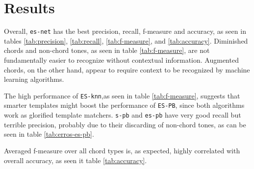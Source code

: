 \documentclass{article}
\begin{document}
\section{Results}
\label{sec:discussion}


Overall, \texttt{es-net} has the best precision, recall, f-measure and
accuracy, as seen in tables \ref{tab:precision}, \ref{tab:recall},
\ref{tab:f-measure}, and \ref{tab:accuracy}. Diminished chords and
non-chord tones, as seen in table \ref{tab:f-measure}, are not
fundamentally easier to recognize without contextual
information. Augmented chords, on the other hand, appear to require
context to be recognized by machine learning algorithms.

The high performance of \texttt{ES-knn},as seen in table
\ref{tab:f-measure}, suggests that smarter templates might boost the
performance of \texttt{ES-PB}, since both algorithms work as glorified
template matchers. \texttt{s-pb} and \texttt{es-pb} have very good
recall but terrible precision, probably due to their discarding of
non-chord tones, as can be seen in table \ref{tab:erros-es-pb}. 

Averaged f-measure over all chord types is, as expected, highly
correlated with overall accuracy, as seen it table \ref{tab:accuracy}.
\end{document}
